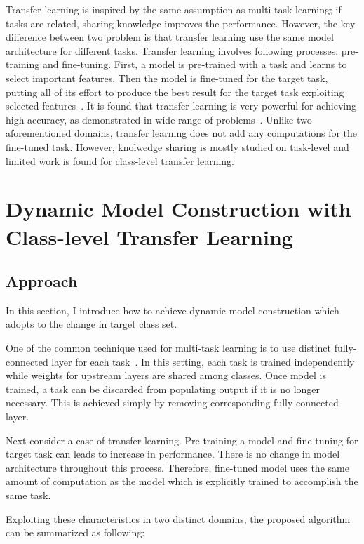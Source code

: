 \documentclass{article}
\begin{document}
Transfer learning is inspired by the same assumption as multi-task learning; if tasks are related, sharing knowledge improves the performance. However, the key difference between two problem is that transfer learning use the same model architecture for different tasks. Transfer learning involves following processes: pre-training and fine-tuning. First, a model is pre-trained with a task and learns to select important features. Then the model is fine-tuned for the target task, putting all of its effort to produce the best result for the target task exploiting selected features~\cite{yosinski2014transferable}. It is found that transfer learning is very powerful for achieving high accuracy, as demonstrated in wide range of problems~\cite{raina2007self, egan2004effects, glorot2011domain}. Unlike two aforementioned domains, transfer learning does not add any computations for the fine-tuned task. However, knolwedge sharing is mostly studied on task-level and limited work is found for class-level transfer learning.

\section{Dynamic Model Construction with Class-level Transfer Learning}

\subsection{Approach}

In this section, I introduce how to achieve dynamic model construction which adopts to the change in target class set.

One of the common technique used for multi-task learning is to use distinct fully-connected layer for each task~\cite{huang2016mtnet, girshick2015fast, long2017learning}. In this setting, each task is trained independently while weights for upstream layers are shared among classes. Once model is trained, a task can be discarded from populating output if it is no longer necessary. This is achieved simply by removing corresponding fully-connected layer.

Next consider a case of transfer learning. Pre-training a model and fine-tuning for target task can leads to increase in performance. There is no change in model architecture throughout this process. Therefore, fine-tuned model uses the same amount of computation as the model which is explicitly trained to accomplish the same task.

Exploiting these characteristics in two distinct domains, the proposed algorithm can be summarized as following:
\end{document}
